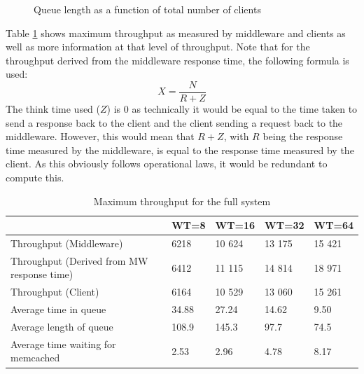 \documentclass[11pt,a4paper]{article}
\begin{document}
\begin{figure}[!h]
\begin{minipage}[b]{.45\textwidth}
        \caption{Queue length as a function of total number of clients}
        \label{png::throughput_writes_ql}
    \end{minipage}
\end{figure}

Table \ref{table::max_through_section_4} shows maximum throughput as measured by middleware and clients as well as more information at that level of throughput. Note that for the throughput derived from the middleware response time, the following formula is used:
$$
X = \frac{N}{R + Z}
$$
The think time used ($Z$) is 0 as technically it would be equal to the time taken to send a response back to the client and the client sending a request back to the middleware. However, this would mean that $R + Z$, with $R$ being the response time measured by the middleware, is equal to the response time measured by the client. As this obviously follows operational laws, it would be redundant to compute this.

\begin{table}[!h]
    \centering
    \begin{tabular}{|l|p{1.5cm}|p{1.5cm}|p{1.5cm}|p{1.5cm}|}
        \hline                                            &   WT=8 &   WT=16 &   WT=32 &   WT=64 \\
        \hline Throughput (Middleware)                    &   6218 &  10 624 &  13 175 &  15 421 \\
        \hline Throughput (Derived from MW response time) &   6412 &  11 115 &  14 814 &  18 971 \\
        \hline Throughput (Client)                        &   6164 &  10 529 &  13 060 &  15 261 \\
        \hline Average time in queue                      &  34.88 &   27.24 &   14.62 &    9.50 \\
        \hline Average length of queue                    &  108.9 &   145.3 &    97.7 &    74.5 \\
        \hline Average time waiting for memcached         &   2.53 &    2.96 &    4.78 &    8.17 \\
        \hline
    \end{tabular}
    \caption{Maximum throughput for the full system}
    \label{table::max_through_section_4}
\end{table}
\end{document}
